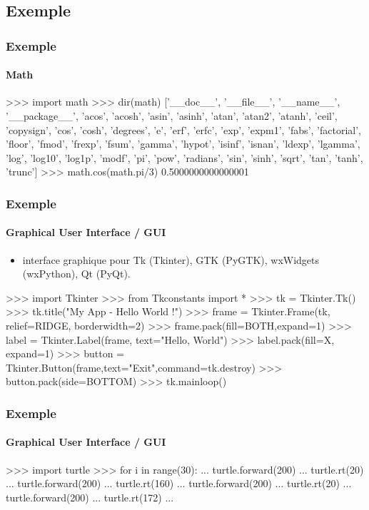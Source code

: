 \subsection{Exemple}
\begin{frame}[fragile]
\frametitle{Exemple}
\framesubtitle{Math}
\begin{pythonConsole}
>>> import math
>>> dir(math)
['__doc__', '__file__', '__name__', '__package__', 'acos', 'acosh', 
'asin', 'asinh', 'atan', 'atan2', 'atanh', 'ceil', 'copysign', 'cos', 'cosh', 
'degrees', 'e', 'erf', 'erfc', 'exp', 'expm1', 'fabs', 'factorial', 'floor', 
'fmod', 'frexp', 'fsum', 'gamma', 'hypot', 'isinf', 'isnan', 'ldexp', 
'lgamma', 'log', 'log10', 'log1p', 'modf', 'pi', 'pow', 'radians', 'sin', 
'sinh', 'sqrt', 'tan', 'tanh', 'trunc'] 
>>> math.cos(math.pi/3)
0.5000000000000001
\end{pythonConsole}
\end{frame}
\begin{frame}[fragile]
\frametitle{Exemple}
\framesubtitle{Graphical User Interface / GUI}
\begin{itemize}
\item interface graphique pour Tk (Tkinter), GTK (PyGTK), wxWidgets (wxPython), Qt (PyQt).  
\end{itemize}
\begin{pythonConsole}
>>> import Tkinter
>>> from Tkconstants import *
>>> tk = Tkinter.Tk()
>>> tk.title("My App - Hello World !")
>>> frame = Tkinter.Frame(tk, relief=RIDGE, borderwidth=2)
>>> frame.pack(fill=BOTH,expand=1)
>>> label = Tkinter.Label(frame, text="Hello, World")
>>> label.pack(fill=X, expand=1)
>>> button = Tkinter.Button(frame,text="Exit",command=tk.destroy)
>>> button.pack(side=BOTTOM)
>>> tk.mainloop()
\end{pythonConsole}
\begin{center}
\end{center}
\end{frame}
\begin{frame}[fragile]
\frametitle{Exemple}
\framesubtitle{Graphical User Interface / GUI}
\begin{pythonConsole}
>>> import turtle
>>> for i in range(30): 
...     turtle.forward(200)
...     turtle.rt(20)
...     turtle.forward(200)
...     turtle.rt(160)
...     turtle.forward(200)
...     turtle.rt(20)
...     turtle.forward(200)
...     turtle.rt(172)
... 
\end{pythonConsole}
\begin{center}
\end{center}
\end{frame}
